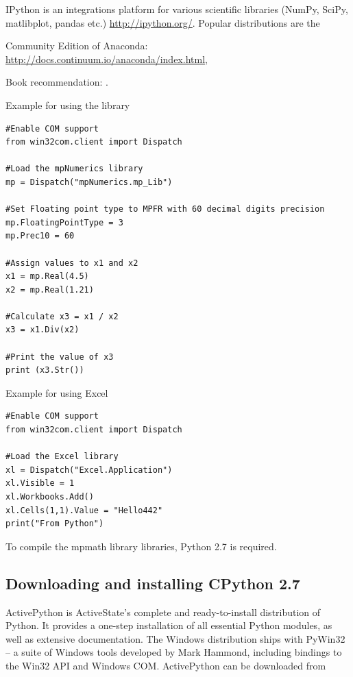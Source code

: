 \vpara
IPython is an integrations platform for various scientific libraries (NumPy, SciPy, matlibplot, pandas etc.) \href{http://ipython.org/}{http://ipython.org/}. Popular distributions are the 

Community Edition of Anaconda: \href{http://docs.continuum.io/anaconda/index.html}{http://docs.continuum.io/anaconda/index.html}, 

%

\vpara
Book recommendation: \cite{McKinney2012}.

\vpara
Example for using the library

\begin{lstlisting}
#Enable COM support
from win32com.client import Dispatch

#Load the mpNumerics library
mp = Dispatch("mpNumerics.mp_Lib")

#Set Floating point type to MPFR with 60 decimal digits precision
mp.FloatingPointType = 3
mp.Prec10 = 60

#Assign values to x1 and x2
x1 = mp.Real(4.5)
x2 = mp.Real(1.21)

#Calculate x3 = x1 / x2
x3 = x1.Div(x2)

#Print the value of x3
print (x3.Str())
\end{lstlisting}

\vpara
Example for using Excel

\begin{lstlisting}
#Enable COM support
from win32com.client import Dispatch

#Load the Excel library
xl = Dispatch("Excel.Application")
xl.Visible = 1
xl.Workbooks.Add() 
xl.Cells(1,1).Value = "Hello442" 
print("From Python")
\end{lstlisting}



To compile the mpmath library libraries, Python 2.7 is required.

\subsection{Downloading and installing  CPython 2.7}
ActivePython is ActiveState's complete and ready-to-install distribution of Python. It provides a one-step installation of all essential Python modules, as well as extensive documentation. 
The Windows distribution ships with PyWin32 -- a suite of Windows tools developed by Mark Hammond, including bindings to the Win32 API and Windows COM. 
ActivePython can be downloaded from

